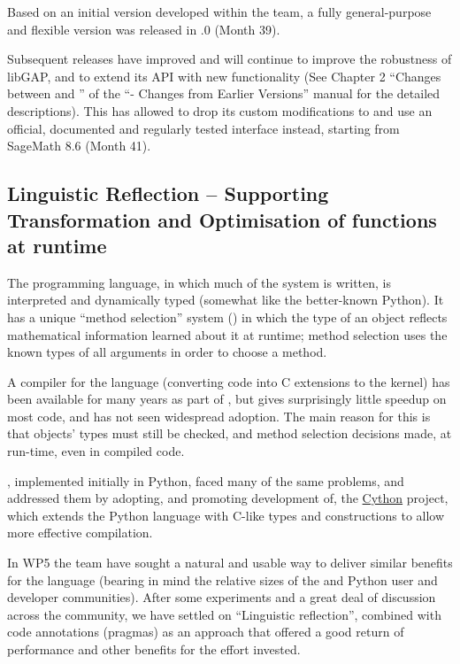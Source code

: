Based on an initial version developed within the \Sage team, a fully
general-purpose and flexible version was released in .0
(Month 39).

Subsequent releases have improved and will continue to improve the
robustness of libGAP, and to extend its API with new functionality (See Chapter 2 
``Changes between  and '' of the 
``\GAP - Changes from Earlier Versions'' manual for the detailed
descriptions). This has allowed \Sage to drop its custom 
modifications to \GAP and use an official, documented and regularly 
tested \GAP interface instead, starting from SageMath 8.6 (Month 41).


\subsection{Linguistic Reflection -- Supporting Transformation and
  Optimisation of \GAP functions at runtime}\label{syntaxtree}
The \GAP programming language, in which much of the system is written,
is interpreted and dynamically typed (somewhat like the better-known
Python). It has a unique ``method selection'' system
(\cite{BreuerLinton98}) in which the type of an object reflects
mathematical information learned about it at runtime; method
selection uses the known types of all arguments in order to choose a method.

A compiler for the language (converting \GAP code
into C extensions to the \GAP kernel) has been available for many
years as part of \GAP, but gives surprisingly little speedup on most code, and has not
seen widespread adoption. The main reason for this is that objects'
types must still be checked, and method selection decisions made, at
run-time, even in compiled code.

\Sage, implemented initially in Python, faced many of the same
problems, and addressed them by adopting, and promoting
development of, the \href{http://cython.org}{Cython} project, which
extends the Python language with C-like types and constructions to
allow more effective compilation.

In WP5 the \GAP team have sought a natural and usable way to deliver
similar benefits for the \GAP language (bearing in mind the relative
sizes of the \GAP and Python user and developer communities). After
some experiments and a great deal of discussion across the community,
we have settled on ``Linguistic reflection'', combined with code
annotations (pragmas) as an approach that offered a good return of
performance and other benefits for the effort invested.

